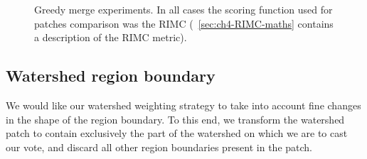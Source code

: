 \begin{figure}[ht!]
\centering
\caption[Greedy merge experiments]{Greedy merge experiments. In all cases the scoring function used for patches comparison was the RIMC (\textsection~\ref{sec:ch4-RIMC-maths} contains a description of the RIMC metric).} %
\label{fig:segs-to-greedy-merge-RIMC}
\end{figure}

\subsection*{Watershed region boundary}
We would like our watershed weighting strategy to take into account fine changes in the shape of the region boundary. To this end, we transform the watershed patch to contain exclusively the part of the watershed on which we are to cast our vote, and discard all other region boundaries present in the patch.

